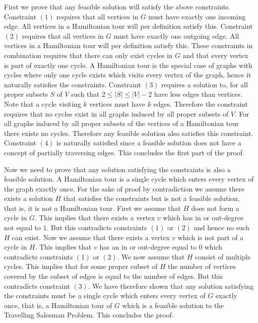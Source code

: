 First we prove that any feasible solution will satisfy the above constraints. Constraint $(1)$ requires that all vertices in $G$ must have exactly one incoming edge. All vertices in a Hamiltonian tour will per definition satisfy this. Constraint $(2)$ requires that all vertices in $G$ must have exactly one outgoing edge. All vertices in a Hamiltonian tour will per definition satisfy this. These constraints in combination requires that there can only exist cycles in $G$ and that every vertex is part of exactly one cycle. A Hamiltonian tour is the special case of graphs with cycles where only one cycle exists which visits every vertex of the graph, hence it naturally satisfies the constraints. Constraint $(3)$ requires a solution to, for all proper subsets $S $ of $V$ such that $2 \leq |S| \leq |V| - 2$ have less edges than vertices. Note that a cycle visiting $k$ vertices must have $k$ edges. Therefore the constraint requires that no cycles exist in all graphs induced by all proper subsets of $V$. For all graphs induced by all proper subsets of the vertices of a Hamiltonian tour there exists no cycles. Therefore any feasible solution also satisfies this constraint. Constraint $(4)$ is naturally satisfied since a feasible solution does not have a concept of partially traversing edges. This concludes the first part of the proof.

Now we need to prove that any solution satisfying the constraints is also a feasible solution. A Hamiltonian tour is a single cycle which enters every vertex of the graph exactly once. For the sake of proof by contradiction we assume there exists a solution $H$ that satisfies the constraints but is not a feasible solution, that is, it is not a Hamiltonian tour. First we assume that $H$ does not form a cycle in $G$. This implies that there exists a vertex $v$ which has in or out-degree not equal to $1$. But this contradicts constraints $(1)$ or $(2)$ and hence no such $H$ can exist. Now we assume that there exists a vertex $v$ which is not part of a cycle in $H$. This implies that $v$ has an in or out-degree equal to $0$ which contradicts constraints $(1)$ or $(2)$. We now assume that $H$ consist of multiple cycles. This implies that for some proper subset of $H$ the number of vertices covered by the subset of edges is equal to the number of edges. But this contradicts constraint $(3)$. We have therefore shown that any solution satisfying the constraints must be a single cycle which enters every vertex of $G$ exactly once, that is, a Hamiltonian tour of $G$ which is a feasible solution to the Travelling Salesman Problem. This concludes the proof.

